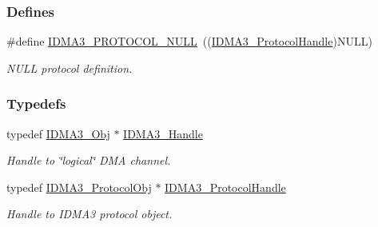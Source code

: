 \subsubsection*{Defines}
\begin{CompactItemize}
\item 
\#define \hyperlink{group___d_s_p_i_d_m_a3_g85de540d61ac83857803528f25f44e4b}{IDMA3\_\-PROTOCOL\_\-NULL}~((\hyperlink{struct_i_d_m_a3___protocol_obj}{IDMA3\_\-Protocol\-Handle})NULL)
\begin{CompactList}\small\item\em NULL protocol definition. \item\end{CompactList}\end{CompactItemize}
\subsubsection*{Typedefs}
\begin{CompactItemize}
\item 
typedef \hyperlink{struct_i_d_m_a3___obj}{IDMA3\_\-Obj} $\ast$ \hyperlink{group___d_s_p_i_d_m_a3_g8960c528f0708a559bcaab34a865e1a5}{IDMA3\_\-Handle}
\begin{CompactList}\small\item\em Handle to \char`\"{}logical\char`\"{} DMA channel. \item\end{CompactList}\item 
typedef \hyperlink{struct_i_d_m_a3___protocol_obj}{IDMA3\_\-Protocol\-Obj} $\ast$ \hyperlink{group___d_s_p_i_d_m_a3_gdd329735609d8384c3625554c0f2c58d}{IDMA3\_\-Protocol\-Handle}
\begin{CompactList}\small\item\em Handle to IDMA3 protocol object. \item\end{CompactList}\end{CompactItemize}

